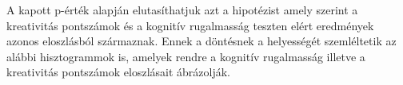 \documentclass[oneside,titlepage,12pt,a4paper]{report}
\begin{document}
A kapott p-érték alapján elutasíthatjuk azt a hipotézist amely szerint a kreativitás pontszámok és a kognitív rugalmasság teszten elért eredmények azonos eloszlásból származnak. Ennek a döntésnek a helyességét szemléltetik az alábbi hisztogrammok is, amelyek rendre a kognitív rugalmasság illetve a kreativitás pontszámok eloszlásait ábrázolják.


\begin{figure}[htb!] \label{fig:eredetiVSsajat}
  \centering
{}
\end{figure}

\section*{}
\end{document}
